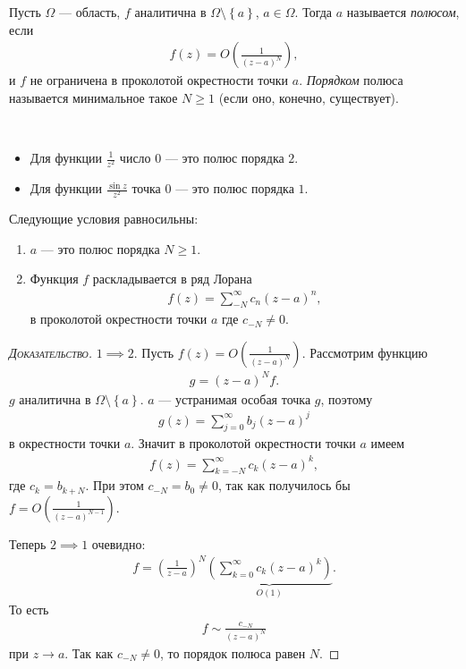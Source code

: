 \documentclass[../../main.tex]{subfiles}
\begin{document}
\begin{df}[полюс]
 Пусть $ \Omega $ --- область, $ f $ аналитична в $ \Omega \setminus \left\{ a \right\} $, $ a \in \Omega $. Тогда $ a $ называется \textit{полюсом}, если
 \begin{align*}
  f(z) = O \left( \frac{1}{(z-a)^{N}} \right),
 \end{align*} и $ f $ не ограничена в проколотой окрестности точки $ a $. \textit{Порядком} полюса называется минимальное такое $ N \geqslant 1 $ (если оно, конечно, существует).
\end{df}
\begin{exmpl}\
 \begin{itemize}
  \item Для функции $ \frac{1}{z^{2}} $ число $ 0 $ --- это полюс порядка $ 2 $.
  \item Для функции $ \frac{\sin z}{z^{2}} $ точка $ 0 $ --- это полюс порядка $ 1 $.
 \end{itemize}
\end{exmpl}
\begin{thm}
 Следующие условия равносильны:
 \begin{enumerate}
  \item $ a $ --- это полюс порядка $ N \geqslant 1$.
  \item Функция $ f $ раскладывается в ряд Лорана
   \begin{align*}
    f(z) = \sum_{-N}^{\infty} c_n(z-a)^{n},
   \end{align*} в проколотой окрестности точки $ a $ где $ c_{-N} \neq 0 $.
 \end{enumerate}
\end{thm}
\begin{proof}[\normalfont\textsc{Доказательство}]
 $  1 \implies 2 $. Пусть $ f(z) = O (\frac{1}{(z-a)^{N}}) $. Рассмотрим функцию
 \begin{align*}
  g = (z-a)^{N} f.
 \end{align*} $ g $ аналитична в $ \Omega \setminus \left\{ a \right\} $. $ a $ --- устранимая особая точка $ g $, поэтому
 \begin{align*}
  g(z) = \sum_{j=0}^{\infty} b_j(z-a)^{j}
 \end{align*} в окрестности точки $ a $. Значит в проколотой окрестности точки $ a $ имеем
 \begin{align*}
  f(z) = \sum_{k=-N}^{\infty} c_k (z-a)^{k},
 \end{align*} где $ c_k = b_{k+N} $. При этом $ c_{-N} = b_0 \neq 0 $, так как получилось бы $ f = O \left( \frac{1}{(z-a)^{N-1}} \right) $.

 Теперь $ 2 \implies 1 $ очевидно:
 \begin{align*}
  f = \left(\frac{1}{z-a} \right)^{N} \underbrace{\left( \sum_{k=0}^{\infty} c_{k} (z-a)^{k} \right)}_{O(1)}.
 \end{align*} То есть
 \begin{align*}
  f \sim \frac{c_{-N}}{(z-a)^{N}}
 \end{align*} при $ z \to a $. Так как $ c_{-N} \neq 0 $, то порядок полюса равен $ N $.
\end{proof}
\end{document}
